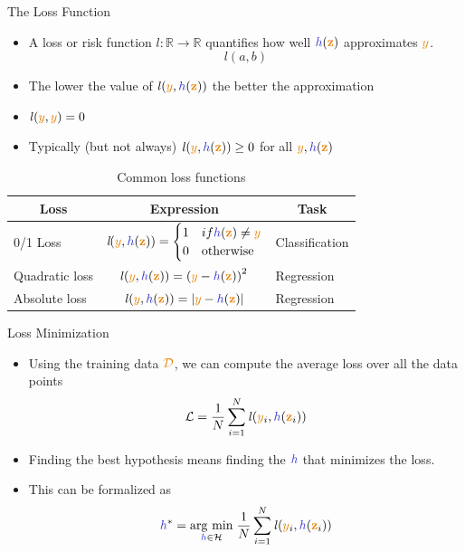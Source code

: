 \documentclass[aspectratio=169,10pt]{beamer}
\begin{document}
\begin{frame}{The Loss Function}
	\begin{itemize}
		\item A loss or risk function $\textit{l}: \mathbb{R} \rightarrow \mathbb{R}$ quantifies how well $\hypothesis(\boldx)$ approximates $\smally$.
		\begin{equation*}
			\mathit{l}(a,b)
		\end{equation*}
	\vspace{-15pt}
	\pause
	\item The lower the value of $\mathit{l}(\smally,\hypothesis(\boldx))$ the better the approximation
	\item $\mathit{l}(\smally,\smally) = 0$
	\item Typically (but not always) $\mathit{l}(\smally,\hypothesis(\boldx)) \geq 0$ for all $\smally,\hypothesis(\boldx)$
\end{itemize}
\begin{table}
\pause
\begin{tabular}{|l | c | l |}
	\hline
	\multicolumn{1}{|c|}{\textbf{Loss}} & \multicolumn{1}{c|}{\textbf{Expression}} &  \multicolumn{1}{c|}{\textbf{Task}}\\
	\hline
	0/1 Loss & $\textit{l}(\smally, \hypothesis(\boldx)) = \begin{cases} 1 & if  \hypothesis(\boldx) \neq \smally \\ 0 & \text{otherwise} \end{cases}$ & Classification\\
	Quadratic loss &	$\mathit{l}(\smally,\hypothesis(\boldx))=\left(\smally - \hypothesis(\boldx)\right)^2$ & Regression\\
	Absolute loss &	$\mathit{l}(\smally,\hypothesis(\boldx))= |\smally - \hypothesis(\boldx)|$ & Regression\\
	\hline
\end{tabular}
\caption{Common loss functions}
\end{table}

\end{frame}

\begin{frame}{Loss Minimization}
	\begin{itemize}
		\item Using the training data $\trainset$, we can compute the average loss over all the data points
		\begin{equation*}
			\mathcal{L}=\dfrac{1}{N}\sum_{i=1}^N \mathit{l}(\smally_i, \hypothesis(\boldx_i))
		\end{equation*}
		\pause
	\item Finding the best hypothesis means finding the $\hypothesis$ that minimizes the loss.
	\item This can be formalized as
	\begin{equation*}
		\hypothesis^* = \argmin{\hypothesis \in \mathcal{H}} \dfrac{1}{N}\sum_{i=1}^N \mathit{l}(\smally_i, \hypothesis(\boldx_i))
	\end{equation*}
	\end{itemize}
	
\end{frame}
\end{document}
